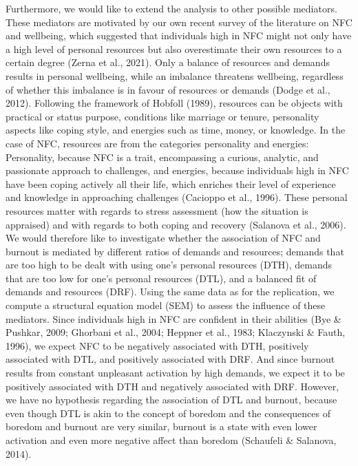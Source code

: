 \documentclass[
  english,
  man]{apa6}
\begin{document}
Furthermore, we would like to extend the analysis to other possible mediators.
These mediators are motivated by our own recent survey of the literature on NFC and wellbeing, which suggested that individuals high in NFC might not only have a high level of personal resources but also overestimate their own resources to a certain degree (Zerna et al., 2021).
Only a balance of resources and demands results in personal wellbeing, while an imbalance threatens wellbeing, regardless of whether this imbalance is in favour of resources or demands (Dodge et al., 2012).
Following the framework of Hobfoll (1989), resources can be objects with practical or status purpose, conditions like marriage or tenure, personality aspects like coping style, and energies such as time, money, or knowledge.
In the case of NFC, resources are from the categories personality and energies: Personality, because NFC is a trait, encompassing a curious, analytic, and passionate approach to challenges, and energies, because individuals high in NFC have been coping actively all their life, which enriches their level of experience and knowledge in approaching challenges (Cacioppo et al., 1996).
These personal resources matter with regards to stress assessment (how the situation is appraised) and with regards to both coping and recovery (Salanova et al., 2006).
We would therefore like to investigate whether the association of NFC and burnout is mediated by different ratios of demands and resources; demands that are too high to be dealt with using one's personal resources (DTH), demands that are too low for one's personal resources (DTL), and a balanced fit of demands and resources (DRF).
Using the same data as for the replication, we compute a structural equation model (SEM) to assess the influence of these mediators.
Since individuals high in NFC are confident in their abilities (Bye \& Pushkar, 2009; Ghorbani et al., 2004; Heppner et al., 1983; Klaczynski \& Fauth, 1996), we expect NFC to be negatively associated with DTH, positively associated with DTL, and positively associated with DRF.
And since burnout results from constant unpleasant activation by high demands, we expect it to be positively associated with DTH and negatively associated with DRF.
However, we have no hypothesis regarding the association of DTL and burnout, because even though DTL is akin to the concept of boredom and the consequences of boredom and burnout are very similar, burnout is a state with even lower activation and even more negative affect than boredom (Schaufeli \& Salanova, 2014).
\end{document}
